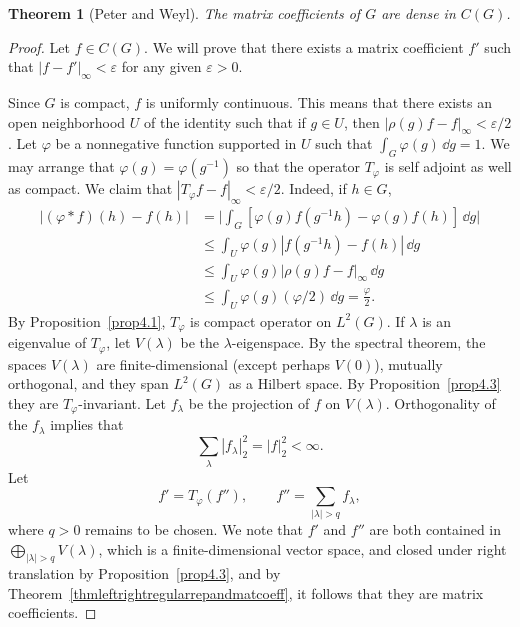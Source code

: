 \documentclass[12pt,reqno]{book}%
\newtheorem{theorem}{Theorem}[chapter]
\theoremstyle{definition}
\theoremstyle{remark}
\theoremstyle{theorem}
\theoremstyle{remark}
\renewcommand{\d}{\dd}
\begin{document}
\begin{theorem}[Peter and Weyl]\label{thmpeterweyl}%
    The matrix coefficients of $G$ are dense in $C(G)$.
\end{theorem}%
\begin{proof}%
    Let $f \in C(G)$.
    We will prove that there exists a matrix coefficient $f'$ such that $|f - f'|_\infty < \varepsilon$ for any given $\varepsilon > 0$.

    Since $G$ is compact, $f$ is uniformly continuous.
    This means that there exists an open neighborhood $U$ of the identity such that if $g \in U$, then $|\rho(g)f - f|_\infty < \varepsilon/2$.
    Let $\varphi$ be a nonnegative function supported in $U$ such that $\int_{G} \varphi(g) \, \d g = 1$.
    We may arrange that $\varphi(g) = \varphi(g^{-1})$ so that the operator $T_\varphi$ is self adjoint as well as compact.
    We claim that $|T_\varphi f - f|_\infty < \varepsilon/2$.
    Indeed, if $h \in G$,
    \begin{align*}
        |(\varphi * f)(h) - f(h)| &= \bigg|\int_{G} [\varphi(g) f(g^{-1}h) - \varphi(g) f(h)] \, \d g \bigg| \\
        &\leq \int_{U} \varphi(g) |f(g^{-1}h) - f(h)| \, \d g \\
        &\leq \int_{U} \varphi(g) |\rho(g)f - f|_\infty \, \d g \\
        &\leq \int_{U} \varphi(g) (\varphi/2) \, \d g = \frac{\varphi}{2}.
    \end{align*}
    By Proposition~\ref{prop4.1}, $T_\varphi$ is compact operator on $L^2(G)$.
    If $\lambda$ is an eigenvalue of $T_\varphi$, let $V(\lambda)$ be the $\lambda$-eigenspace.
    By the spectral theorem, the spaces $V(\lambda)$ are finite-dimensional (except perhaps $V(0)$), mutually orthogonal, and they span $L^2(G)$ as a Hilbert space.
    By Proposition~\ref{prop4.3} they are $T_\varphi$-invariant.
    Let $f_\lambda$ be the projection of $f$ on $V(\lambda)$.
    Orthogonality of the $f_\lambda$ implies that
    \begin{equation}\label{eqpeterweyl}
        \sum_{\lambda} |f_\lambda|_{2}^{2} = |f|_{2}^{2} < \infty.
    \end{equation}
    Let
    \[
        f' = T_\varphi(f''), \qquad f'' =  \sum_{|\lambda| > q} f_\lambda,
    \]
    where $q > 0$ remains to be chosen.
    We note that $f'$ and $f''$ are both contained in $\bigoplus_{|\lambda| > q} V(\lambda)$, which is a finite-dimensional vector space, and closed under right translation by Proposition~\ref{prop4.3}, and by Theorem~\ref{thmleftrightregularrepandmatcoeff}, it follows that they are matrix coefficients.


\end{proof}
\end{document}
